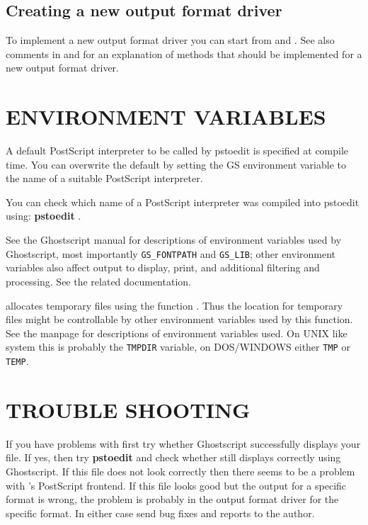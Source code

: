 \documentclass[english,a4paper]{article}
\begin{document}
  \subsection{Creating a new output format driver}

    To implement a new output format driver you can start from  and
    . See also comments in  and
     for an explanation of methods that should be implemented
    for a new output format driver.


\section{ENVIRONMENT VARIABLES}

A default PostScript interpreter to be called by pstoedit is specified at
compile time. You can overwrite the default by setting the GS environment
variable to the name of a suitable PostScript interpreter.

You can check which name of a PostScript interpreter was compiled into
pstoedit using: \textbf{pstoedit} .

See the Ghostscript manual for descriptions of environment variables used by
Ghostscript, most importantly \verb+GS_FONTPATH+ and \verb+GS_LIB+; other
environment variables also affect output to display, print, and additional
filtering and processing. See the related documentation.

 allocates temporary files using the function .
Thus the location for temporary files might be controllable by other
environment variables used by this function. See the  manpage
for descriptions of environment variables used. On UNIX like system this is
probably the \verb+TMPDIR+ variable, on DOS/WINDOWS either \verb+TMP+ or
\verb+TEMP+.

\section{TROUBLE SHOOTING}

If you have problems with  first try whether Ghostscript
successfully displays your file. If yes, then try
\textbf{pstoedit}   
and check whether  still displays correctly using
Ghostscript. If this file does not look correctly then there seems to be a
problem with 's PostScript frontend. If this file looks good
but the output for a specific format is wrong, the problem is probably in
the output format driver for the specific format. In either case send bug fixes and
reports to the author.
\end{document}
